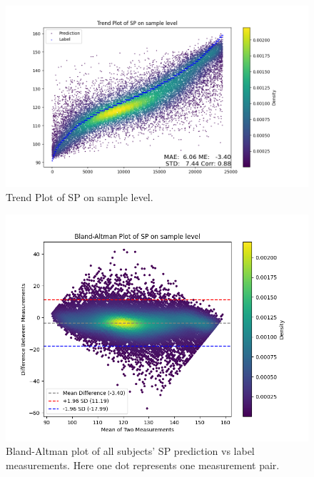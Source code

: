 \documentclass{article}
\begin{document}
\begin{figure}[H]
\centering
\includegraphics[width=\textwidth]{./Fig/Trend_Plot_SP_on_sample_level.png}
\caption{Trend Plot of SP on sample level.}
\label{fig:image1}
\end{figure}

\begin{figure}[H]
\centering
\includegraphics[width=\textwidth]{./Fig/Bland_Altman_Plot_SP_on_sample_level.png}
\caption{Bland-Altman plot of all subjects' SP prediction vs label measurements. Here one dot represents one measurement pair.}
\label{fig:image1}
\end{figure}
\end{document}
